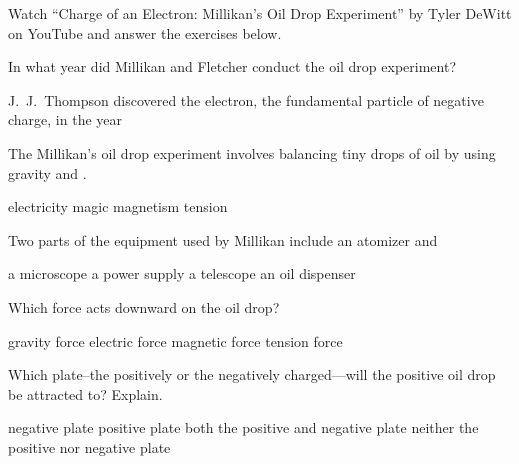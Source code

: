 \documentclass[../main-physics-problems.tex]{subfiles}
\begin{document}
    
\begin{questions}

\question
Watch ``Charge of an Electron: Millikan's Oil Drop Experiment'' by Tyler DeWitt on YouTube 
and answer the exercises below.

\question
In what year did Millikan and Fletcher conduct the oil drop experiment?

\begin{randomizechoices}
\end{randomizechoices}

\question
J.~J.~Thompson discovered the electron, the fundamental particle of negative charge, in the year \fillin[][3cm]

\begin{randomizechoices}
\end{randomizechoices}

\question
The Millikan's oil drop experiment involves balancing tiny drops of oil by using gravity and \fillin[][3cm].

\begin{randomizechoices}
    \correctchoice electricity
    \choice magic
    \choice magnetism
    \choice tension
\end{randomizechoices}

\question
Two parts of the equipment used by Millikan include an atomizer and 

\begin{randomizechoices}
    \correctchoice a microscope
    \choice a power supply
    \choice a telescope
    \choice an oil dispenser
\end{randomizechoices}

\question
Which force acts downward on the oil drop?

\begin{randomizechoices}
    \correctchoice gravity force
    \choice electric force
    \choice magnetic force
    \choice tension force
\end{randomizechoices}

\question
Which plate--the positively or the negatively charged---will the positive oil drop be attracted to? Explain.

\begin{randomizechoices}
    \correctchoice negative plate
    \choice positive plate
    \choice both the positive and negative plate
    \choice neither the positive nor negative plate
\end{randomizechoices}


\end{questions}
\end{document}

